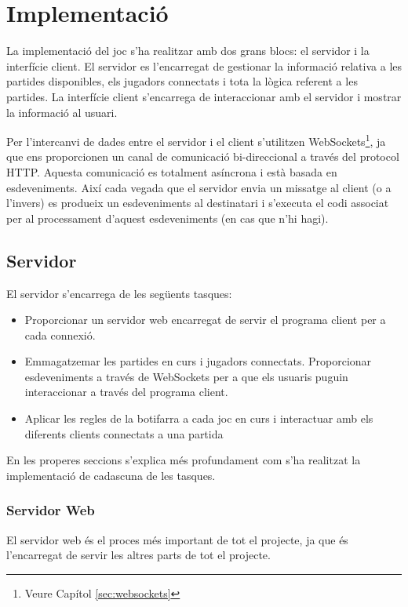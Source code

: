 \chapter{Implementació}
\label{chap:implementacio}

La implementació del joc s'ha realitzar amb dos grans blocs: el servidor i la interfície client. El servidor es l'encarregat de gestionar la informació relativa a les partides disponibles, els jugadors connectats i tota la lògica referent a les partides. La interfície client s'encarrega de interaccionar amb el servidor i mostrar la informació al usuari. 

Per l'intercanvi de dades entre el servidor i el client s'utilitzen WebSockets\footnote{Veure Capítol \ref{sec:websockets}}, ja que ens proporcionen un canal de comunicació bi-direccional a través del protocol HTTP. Aquesta comunicació es totalment asíncrona i està basada en esdeveniments. Així cada vegada que el servidor envia un missatge al client (o a l'invers) es produeix un esdeveniments al destinatari i s'executa el codi associat per al processament d'aquest esdeveniments (en cas que n'hi hagi). 

\section{Servidor}

El servidor s'encarrega de les següents tasques: 

\begin{itemize}
\item{Proporcionar un servidor web encarregat de servir el programa client per a cada connexió.}
\item{Emmagatzemar les partides en curs i jugadors connectats. Proporcionar esdeveniments a través de WebSockets per a que els usuaris puguin interaccionar a través del programa client. }
\item{Aplicar les regles de la botifarra a cada joc en curs i interactuar amb els diferents clients connectats a una partida}
\end{itemize}

En les properes seccions s'explica més profundament com s'ha realitzat la implementació de cadascuna de les tasques. 

\subsection{Servidor Web}

El servidor web és el proces més important de tot el projecte, ja que és l'encarregat de servir les altres parts de tot el projecte. 

